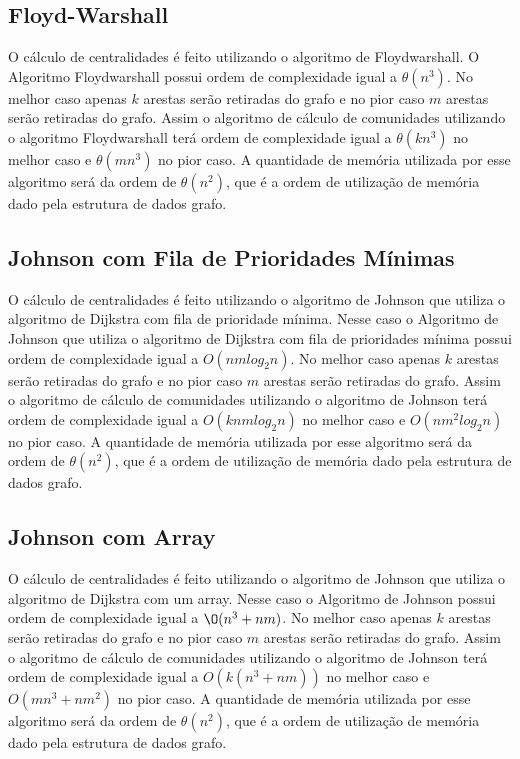 \subsection{Floyd-Warshall}\label{sec:floydwarshall}
O cálculo de centralidades é feito utilizando o algoritmo de Floydwarshall. O Algoritmo Floydwarshall
possui ordem de complexidade igual a $\theta(n^3)$. No melhor caso apenas $k$ arestas serão retiradas do grafo e no pior
caso $m$ arestas serão retiradas do grafo. Assim o algoritmo de cálculo de comunidades utilizando o algoritmo Floydwarshall terá ordem de complexidade igual a $\theta(kn^3)$ no melhor caso e $\theta(mn^3)$ no pior caso. A quantidade
de memória utilizada por esse algoritmo será da ordem de $\theta(n^2)$, que é a ordem de utilização de memória dado pela estrutura
de dados grafo.

\subsection{Johnson com Fila de Prioridades Mínimas}\label{sec:johnson_queue}
O cálculo de centralidades é feito utilizando o algoritmo de Johnson que utiliza o algoritmo de Dijkstra com fila
de prioridade mínima. Nesse caso o Algoritmo de Johnson que utiliza o algoritmo de Dijkstra com fila de prioridades mínima
possui ordem de complexidade igual a $O(nmlog_2n)$. No melhor caso apenas $k$ arestas serão retiradas do grafo e no pior
caso $m$ arestas serão retiradas do grafo. Assim o algoritmo de cálculo de comunidades utilizando o algoritmo de Johnson terá ordem de complexidade igual a $O(knmlog_2n)$ no melhor caso e $O(nm^2log_2n)$ no pior caso. A quantidade
de memória utilizada por esse algoritmo será da ordem de $\theta(n^2)$, que é a ordem de utilização de memória dado pela estrutura
de dados grafo.

\subsection{Johnson com Array}\label{sec:johnson_vector}
O cálculo de centralidades é feito utilizando o algoritmo de Johnson que utiliza o algoritmo de Dijkstra com um array. Nesse caso o Algoritmo de Johnson possui ordem de complexidade igual a $\O(n^3 + nm)$. No melhor caso apenas $k$ arestas serão retiradas do grafo e no pior caso $m$ arestas serão retiradas do grafo. Assim o algoritmo de cálculo de comunidades utilizando o algoritmo de Johnson terá ordem de complexidade igual a $O(k(n^3 + nm))$ no melhor caso e $O(mn^3 + nm^2)$ no pior caso. A quantidade
de memória utilizada por esse algoritmo será da ordem de $\theta(n^2)$, que é a ordem de utilização de memória dado pela estrutura
de dados grafo.


